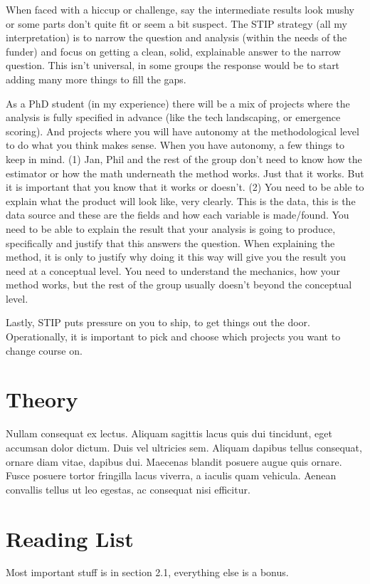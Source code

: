 \documentclass[12pt,letterpaper]{article} %
\begin{document}
When faced with a hiccup or challenge, say the intermediate results look mushy or some parts don't quite fit or seem a bit suspect.  The STIP strategy (all my interpretation) is to narrow the question and analysis (within the needs of the funder) and focus on getting a clean, solid, explainable answer to the narrow question.  This isn't universal, in some groups the response would be to start adding many more things to fill the gaps.

As a PhD student (in my experience) there will be a mix of projects where the analysis is fully specified in advance (like the tech landscaping, or emergence scoring).  And projects where you will have autonomy at the methodological level to do what you think makes sense.  When you have autonomy, a few things to keep in mind.  (1) Jan, Phil and the rest of the group don't need to know how the estimator or how the math underneath the method works.  Just that it works.  But it is important that you know that it works or doesn't.  (2) You need to be able to explain what the product will look like, very clearly.  This is the data, this is the data source and these are the fields and how each variable is made/found.  You need to be able to explain the result that your analysis is going to produce, specifically and justify that this answers the question.  When explaining the method, it is only to justify why doing it this way will give you the result you need at a conceptual level.  You need to understand the mechanics, how your method works, but the rest of the group usually doesn't beyond the conceptual level.

Lastly, STIP puts pressure on you to ship, to get things out the door.  Operationally, it is important to pick and choose which projects you want to change course on.


\section*{Theory}
Nullam consequat ex lectus. Aliquam sagittis lacus quis dui tincidunt, eget accumsan dolor dictum. Duis vel ultricies sem. Aliquam dapibus tellus consequat, ornare diam vitae, dapibus dui. Maecenas blandit posuere augue quis ornare. Fusce posuere tortor fringilla lacus viverra, a iaculis quam vehicula. Aenean convallis tellus ut leo egestas, ac consequat nisi efficitur.
\clearpage
\section*{Reading List}
Most important stuff is in section 2.1, everything else is a bonus.  
\end{document}
